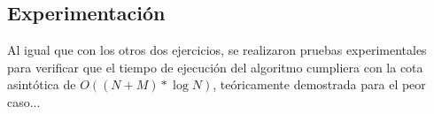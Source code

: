     \subsection{Experimentación}

        Al igual que con los otros dos ejercicios, se realizaron pruebas experimentales para verificar que el tiempo de ejecución del algoritmo cumpliera con la cota asintótica de $O((N+M) * \log N)$, teóricamente demostrada para el peor caso...